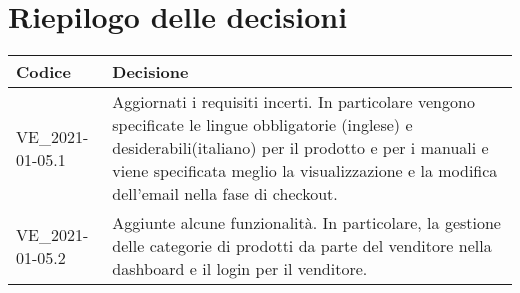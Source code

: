 \section{Riepilogo delle decisioni}
\setcounter{table}{-1}
{
\centering
\renewcommand{\arraystretch}{1.5}
\begin{longtable}{>{\centering}p{} >{}p{}}
\rowcolor{azzurro1}
\textbf{Codice} &
\centerline{\textbf{Decisione}}\\
\endhead

VE{\_}2021-01-05.1 & Aggiornati i requisiti incerti. In particolare vengono specificate le lingue obbligatorie (inglese) e desiderabili(italiano) per il prodotto e per i manuali e viene specificata meglio la visualizzazione e la modifica dell'email nella fase di checkout. \\
VE{\_}2021-01-05.2 & Aggiunte alcune funzionalità. In particolare, la gestione delle categorie di prodotti da parte del venditore nella dashboard e il login per il venditore.\\
\end{longtable}
}